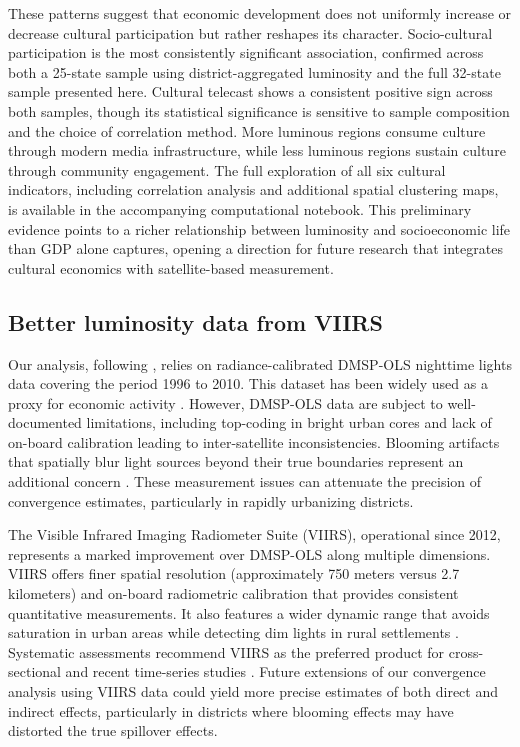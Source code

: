 \documentclass[
  a4paper, 
  twoside,
  review
]{article}
\begin{document}
These patterns suggest that economic development does not uniformly
increase or decrease cultural participation but rather reshapes its
character. Socio-cultural participation is the most consistently
significant association, confirmed across both a 25-state sample using
district-aggregated luminosity and the full 32-state sample presented
here. Cultural telecast shows a consistent positive sign across both
samples, though its statistical significance is sensitive to sample
composition and the choice of correlation method. More luminous regions
consume culture through modern media infrastructure, while less luminous
regions sustain culture through community engagement. The full
exploration of all six cultural indicators, including correlation
analysis and additional spatial clustering maps, is available in the
accompanying computational notebook. This preliminary evidence points to
a richer relationship between luminosity and socioeconomic life than GDP
alone captures, opening a direction for future research that integrates
cultural economics with satellite-based measurement.

\subsection{Better luminosity data from
VIIRS}\label{better-luminosity-data-from-viirs}

Our analysis, following \citet{chanda_kabiraj_district_convergence},
relies on radiance-calibrated DMSP-OLS nighttime lights data covering
the period 1996 to 2010. This dataset has been widely used as a proxy
for economic activity
\citep{henderson_storeygard_weil_lights, chen_nordhaus_luminosity_gdp}.
However, DMSP-OLS data are subject to well-documented limitations,
including top-coding in bright urban cores and lack of on-board
calibration leading to inter-satellite inconsistencies. Blooming
artifacts that spatially blur light sources beyond their true boundaries
represent an additional concern \citep{abrahams_etal_deblurring}. These
measurement issues can attenuate the precision of convergence estimates,
particularly in rapidly urbanizing districts.

The Visible Infrared Imaging Radiometer Suite (VIIRS), operational since
2012, represents a marked improvement over DMSP-OLS along multiple
dimensions. VIIRS offers finer spatial resolution (approximately 750
meters versus 2.7 kilometers) and on-board radiometric calibration that
provides consistent quantitative measurements. It also features a wider
dynamic range that avoids saturation in urban areas while detecting dim
lights in rural settlements \citep{elvidge_etal_viirs}. Systematic
assessments recommend VIIRS as the preferred product for cross-sectional
and recent time-series studies \citep{gibson_etal_ntl_measurement}.
Future extensions of our convergence analysis using VIIRS data could
yield more precise estimates of both direct and indirect effects,
particularly in districts where blooming effects may have distorted the
true spillover effects.
\end{document}
